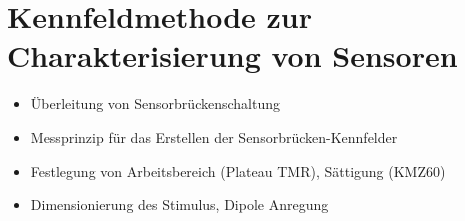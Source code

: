 \clearpage


\section{Kennfeldmethode zur Charakterisierung von Sensoren}\label{sec:kennfeldmethode-zur-charakterisierung}
	\begin{itemize}
		\item Überleitung von Sensorbrückenschaltung
		\item Messprinzip für das Erstellen der Sensorbrücken-Kennfelder
		\item Festlegung von Arbeitsbereich (Plateau TMR), Sättigung (KMZ60)
		\item Dimensionierung des Stimulus, Dipole Anregung
	\end{itemize}
	

